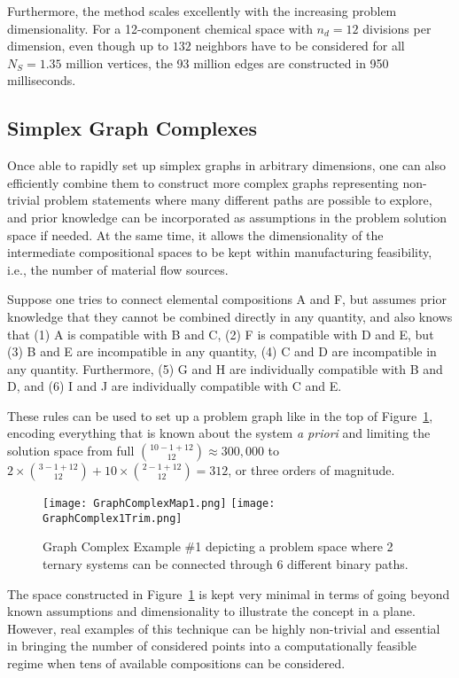 Furthermore, the method scales excellently with the increasing problem dimensionality. For a 12-component chemical space with $n_d=12$ divisions per dimension, even though up to $132$ neighbors have to be considered for all $N_S=1.35$ million vertices, the 93 million edges are constructed in 950 milliseconds.


\subsection{Simplex Graph Complexes} \label{ssec:complexes}

Once able to rapidly set up simplex graphs in arbitrary dimensions, one can also efficiently combine them to construct more complex graphs representing non-trivial problem statements where many different paths are possible to explore, and prior knowledge can be incorporated as assumptions in the problem solution space if needed. At the same time, it allows the dimensionality of the intermediate compositional spaces to be kept within manufacturing feasibility, i.e., the number of material flow sources.

Suppose one tries to connect elemental compositions A and F, but assumes prior knowledge that they cannot be combined directly in any quantity, and also knows that (1) A is compatible with B and C, (2) F is compatible with D and E, but (3) B and E are incompatible in any quantity, (4) C and D are incompatible in any quantity. Furthermore, (5) G and H are individually compatible with B and D, and (6) I and J are individually compatible with C and E. 

These rules can be used to set up a problem graph like in the top of Figure~\ref{fig:graphcomplex1}, encoding everything that is known about the system \textit{a priori} and limiting the solution space from full $\binom{10-1+12}{12} \approx 300,000$ to $2\times\binom{3-1+12}{12} + 10\times\binom{2-1+12}{12} = 312$, or three orders of magnitude.

\begin{figure}[H]
    \centering
    \texttt{[image: GraphComplexMap1.png]}
    \texttt{[image: GraphComplex1Trim.png]}
    \caption{Graph Complex Example \#1 depicting a problem space where 2 ternary systems can be connected through 6 different binary paths.} 
    \label{fig:graphcomplex1}
\end{figure}

The space constructed in Figure~\ref{fig:graphcomplex1} is kept very minimal in terms of going beyond known assumptions and dimensionality to illustrate the concept in a plane. However, real examples of this technique can be highly non-trivial and essential in bringing the number of considered points into a computationally feasible regime when tens of available compositions can be considered. 

